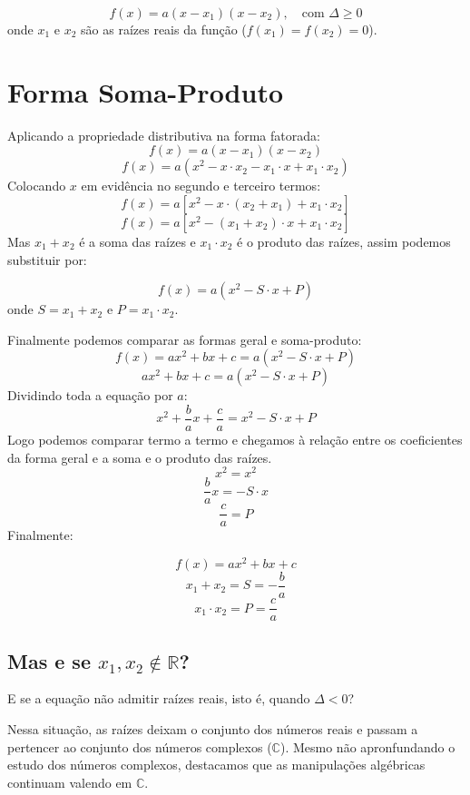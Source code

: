 \documentclass[12pt,a4paper]{report}
\begin{document}
	\begin{destaque}
		\label{dest:formafatorada}
		$$f(x) = a(x - x_1)(x - x_2), \quad \text{com } \Delta \geqslant 0$$
		onde $x_1$ e $x_2$ são as raízes reais da função ($f(x_1) = f(x_2) = 0$).
	\end{destaque}
	
	\section{Forma Soma-Produto}
	Aplicando a propriedade distributiva na forma fatorada:
	$$f(x) = a(x - x_1)(x - x_2)$$
	$$f(x) = a(x^2 -x \cdot x_2 - x_1 \cdot x + x_1 \cdot x_2)$$
	Colocando $x$ em evidência no segundo e terceiro termos:
	$$f(x) = a[x^2 -x \cdot (x_2 + x_1)+ x_1 \cdot x_2]$$
	$$f(x) = a[x^2 - (x_1 + x_2) \cdot x + x_1 \cdot x_2]$$
	Mas $x_1 + x_2$ é a soma das raízes e $x_1 \cdot x_2$ é o produto das raízes, assim podemos substituir por:
\begin{destaque}
	\label{dest:soma-produto}
		$$f(x) = a(x^2 - S \cdot x + P)$$
	onde $S = x_1 + x_2$ e $P=x_1 \cdot x_2$.
\end{destaque}

Finalmente podemos comparar as formas geral e soma-produto:
$$f(x) = ax^2 + bx + c = a(x^2 - S \cdot x + P) $$
$$ax^2 + bx + c = a(x^2 - S \cdot x + P) $$
Dividindo toda a equação por $a$:
$$x^2 + \frac{b}{a}x + \frac{c}{a} = x^2 - S \cdot x + P $$
Logo podemos comparar termo a termo e chegamos à relação entre os coeficientes da forma geral e a soma e o produto das raízes.
$$x^2  = x^2  $$
$$\frac{b}{a}x  = - S \cdot x  $$
$$ \frac{c}{a} =  P $$
Finalmente:
\begin{destaque}
	\label{dest:SP_geral}
	$$f(x) = ax^2 + bx + c$$
	$$x_1 + x_2 = S = - \dfrac{b}{a}$$
	$$x_1 \cdot x_2 = P = \dfrac{c}{a}$$
\end{destaque}

\subsection*{Mas e se $x_1, x_2 \notin \mathbb{R}$?}

E se a equação não admitir raízes reais, isto é, quando $\Delta < 0$?

Nessa situação, as raízes deixam o conjunto dos números reais e passam a pertencer ao conjunto dos números complexos ($\mathbb{C}$). Mesmo não apronfundando o estudo dos números complexos, destacamos que as manipulações algébricas continuam valendo em $\mathbb{C}$. 
\end{document}
